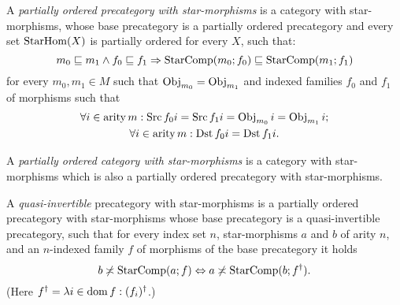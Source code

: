 \begin{defn}
A \emph{partially
ordered precategory with star-morphisms} is a category with star-morphisms,
whose base precategory is a partially ordered precategory and every
set $\operatorname{StarHom}(X)$ is partially ordered for every $X$, such that:
\[
m_{0}\sqsubseteq m_{1}\wedge f_{0}\sqsubseteq f_{1}\Rightarrow\operatorname{StarComp}(m_{0};f_{0})\sqsubseteq\operatorname{StarComp}(m_{1};f_{1})
\]
for every $m_{0},m_{1}\in M$ such that $\operatorname{Obj}_{m_{0}}=\operatorname{Obj}_{m_{1}}$
and indexed families $f_{0}$ and $f_{1}$ of morphisms such that
\begin{gather*}
\forall i\in\operatorname{arity} m:\operatorname{Src} f_{0}i=\operatorname{Src} f_{1}i=\operatorname{Obj}_{m_{0}}i=\operatorname{Obj}_{m_{1}}i;\\
\forall i\in\operatorname{arity} m:\operatorname{Dst} f_{0}i=\operatorname{Dst} f_{1}i.
\end{gather*}

\end{defn}

\begin{defn}
A \emph{partially ordered category with star-morphisms} is a category
with star-morphisms which is also a partially ordered precategory
with star-morphisms.
\end{defn}

\begin{defn}
A \emph{quasi-invertible}
precategory with star-morphisms is a partially ordered precategory
with star-morphisms whose base precategory is a quasi-invertible precategory,
such that for every index set $n$, star-morphisms $a$ and $b$ of
arity $n$, and an $n$-indexed family $f$ of morphisms of the base
precategory it holds 
\[
b\not\asymp\operatorname{StarComp}(a;f)\Leftrightarrow a\not\asymp\operatorname{StarComp}(b;f^{\dagger}).
\]
(Here $f^{\dagger}=\lambda i\in\operatorname{dom} f:(f_{i})^{\dagger}$.)
\end{defn}

